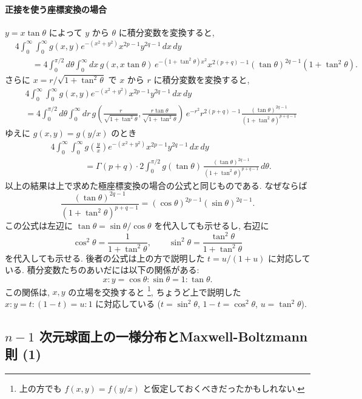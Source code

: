 \documentclass[12pt,twoside]{jarticle}
\theoremstyle{jplain}
\theoremstyle{jplain}
\theoremstyle{jplain}
\numberwithin{theorem}{section}
\numberwithin{equation}{section}
\numberwithin{figure}{section}
\numberwithin{table}{section}
\begin{document}
\paragraph{正接を使う座標変換の場合}
$y=x\tan\theta$ によって $y$ から $\theta$ に積分変数を変換すると,
\begin{align*}
&
4\int_0^\infty\int_0^\infty g(x,y)e^{-(x^2+y^2)}x^{2p-1}y^{2q-1}\,dx\,dy
\\ & \qquad
=
4\int_0^{\pi/2}d\theta\int_0^\infty dx\,
g(x,x\tan\theta)\,e^{-(1+\tan^2\theta)x^2}x^{2(p+q)-1}
(\tan\theta)^{2q-1}(1+\tan^2\theta).
\end{align*}
さらに $x=r/\sqrt{1+\tan^2\theta}$ で $x$ から $r$ に積分変数を変換すると,
\begin{align*}
&
4\int_0^\infty\int_0^\infty g(x,y)e^{-(x^2+y^2)}x^{2p-1}y^{2q-1}\,dx\,dy
\\ &
=
4\int_0^{\pi/2}d\theta\int_0^\infty dr\,
g\left(\frac{r}{\sqrt{1+\tan^2\theta}},\frac{r\tan\theta}{\sqrt{1+\tan^2\theta}}\right)\,
e^{-r^2}r^{2(p+q)-1}
\frac{(\tan\theta)^{2q-1}}{(1+\tan^2\theta)^{p+q-1}}
\end{align*}
ゆえに $g(x,y)=g(y/x)$ のとき
\begin{align*}
&
4\int_0^\infty\int_0^\infty g\left(\frac{y}{x}\right)e^{-(x^2+y^2)}x^{2p-1}y^{2q-1}\,dx\,dy
\\ & \qquad\qquad
=
\Gamma(p+q)\cdot
2\int_0^{\pi/2} g(\tan\theta)\,\frac{(\tan\theta)^{2q-1}}{(1+\tan^2\theta)^{p+q-1}}\,d\theta.
\end{align*}
以上の結果は上で求めた極座標変換の場合の公式と同じものである. なぜならば
\[
\frac{(\tan\theta)^{2q-1}}{(1+\tan^2\theta)^{p+q-1}}
=
(\cos\theta)^{2p-1}(\sin\theta)^{2q-1}.
\]
この公式は左辺に $\tan\theta=\sin\theta/\cos\theta$ を代入しても示せるし,
右辺に
\[
\cos^2\theta=\frac{1}{1+\tan^2\theta}, \qquad
\sin^2\theta=\frac{\tan^2\theta}{1+\tan^2\theta}
\]
を代入しても示せる. 後者の公式は上の方で説明した $t=u/(1+u)$ に対応している.
積分変数たちのあいだには以下の関係がある:
\[
x:y = \cos\theta:\sin\theta = 1:\tan\theta.
\]
この関係は, $x,y$ の立場を交換すると%
\footnote{上の方でも $f(x,y)=f(y/x)$ と仮定しておくべきだったかもしれない.},
ちょうど上で説明した $x:y=t:(1-t)=u:1$ に対応している
($t=\sin^2\theta$, $1-t=\cos^2\theta$, $u=\tan^2\theta$).


\subsection{$n-1$ 次元球面上の一様分布とMaxwell-Boltzmann則 (1)}
\label{sec:MB1}
\end{document}

